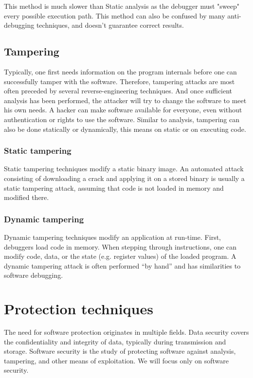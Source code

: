 \documentclass[a4paper,12pt]{article}
\begin{document}
This method is much slower than Static analysis as the debugger must "sweep"
every possible execution path. This method can also be confused by many    
anti-debugging techniques, and doesn't guarantee correct results.

\subsection{Tampering}
Typically,
one first needs information on the program internals before one can successfully
tamper with the software. Therefore, tampering attacks are most often preceded
by several reverse-engineering techniques. And once sufficient analysis has been
performed, the attacker will try to change the software to meet his own needs.
A hacker can make software available for everyone, even without authentication
or rights to use the software. Similar to analysis, tampering can also be done
statically or dynamically, this means on static or on executing code.

\subsubsection{Static tampering}
Static tampering techniques modify a static binary image.
An automated attack consisting of downloading a crack and applying it on a
stored binary is usually a static tampering attack, assuming that code is not
loaded in memory and modified there.

\subsubsection{Dynamic tampering}
Dynamic tampering techniques modify an application
at run-time. First, debuggers load code in memory. When stepping through
instructions, one can modify code, data, or the state (e.g. register values) of
the loaded program. A dynamic tampering attack is often performed “by hand”
and has similarities to software debugging.

\section{Protection techniques}
The need for software protection originates in multiple fields. Data security
covers the confidentiality and integrity of data, typically during transmission
and storage. Software security is the study of protecting software against
analysis, tampering, and other means of exploitation. We will focus only on
software security.
\end{document}
